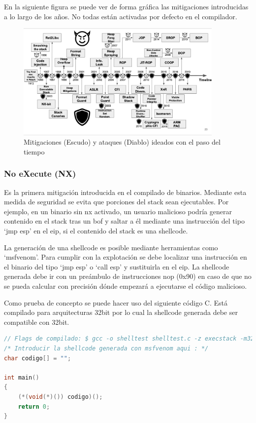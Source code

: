 En la siguiente figura se puede ver de forma gráfica las mitigaciones introducidas a lo largo de los años. No todas están activadas por defecto en el compilador.

\begin{figure}[htb!]
    \centering                        
    \includegraphics[width=0.9\textwidth]{images/mitigaciones.jpeg}
    \caption{Mitigaciones (Escudo) y ataques (Diablo) ideados con el paso del tiempo}
    \label{fig:mitigaciones}
\end{figure}
\FloatBarrier

\subsubsection{No eXecute (NX)}
Es la primera mitigación introducida en el compilado de binarios. Mediante esta medida de seguridad se evita que porciones del stack sean ejecutables.
Por ejemplo, en un binario sin \acrshort{nx} activado, un usuario malicioso podría generar contenido en el stack tras un \acrshort{bof} y saltar a él mediante una instrucción del tipo `jmp esp' en el \acrshort{eip}, si el contenido del stack es una shellcode.

La generación de una shellcode es posible mediante herramientas como `msfvenom'.
Para cumplir con la explotación se debe localizar una instrucción en el binario del tipo `jmp esp' o `call esp' y sustituirla en el \acrshort{eip}. La shellcode generada debe ir con un preámbulo de instrucciones \acrfull{nop} (0x90) en caso de que no se pueda calcular con precisión dónde empezará a ejecutarse el código malicioso.

Como prueba de concepto se puede hacer uso del siguiente código C.
Está compilado para arquitecturas 32bit por lo cual la shellcode generada debe ser compatible con 32bit.

\begin{lstlisting}[language=C, caption=Código C para probar shellcodes]
// Flags de compilado: $ gcc -o shelltest shelltest.c -z execstack -m32
/* Introducir la shellcode generada con msfvenom aqui : */
char codigo[] = "";

int main()
{
    (*(void(*)()) codigo)();
    return 0;
}
\end{lstlisting}

